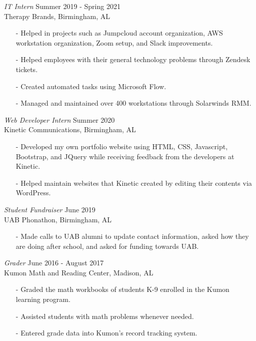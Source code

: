 \documentclass[margin, 10pt]{res} %
\begin{document}
\begin{resume}
{\sl IT Intern} \hfill Summer 2019 - Spring 2021 \\
Therapy Brands, Birmingham, AL 
\begin{itemize} \itemsep -2pt %
\item[-] Helped in projects such as Jumpcloud account organization, AWS workstation organization, Zoom setup, and Slack improvements.
\item[-] Helped employees with their general technology problems through Zendesk tickets.
\item[-] Created automated tasks using Microsoft Flow.
\item[-] Managed and maintained over 400 workstations through Solarwinds RMM.
\end{itemize} 

{\sl Web Developer Intern} \hfill Summer 2020 \\
Kinetic Communications, Birmingham, AL
\begin{itemize} \itemsep -2pt %
\item[-] Developed my own portfolio website using HTML, CSS, Javascript, Bootstrap, and JQuery while receiving feedback from the developers at Kinetic. 
\item[-] Helped maintain websites that Kinetic created by editing their contents via WordPress. 
\end{itemize}

{\sl Student Fundraiser} \hfill June 2019 \\
UAB Phonathon, Birmingham, AL
\begin{itemize} \itemsep -2pt %
\item[-] Made calls to UAB alumni to update contact information, asked how they are doing after school, and asked for funding towards UAB.
\end{itemize}

{\sl Grader} \hfill June 2016 - August 2017 \\
Kumon Math and Reading Center, Madison, AL
\begin{itemize} \itemsep -2pt %
\item[-] Graded the math workbooks of students K-9 enrolled in the Kumon learning program.
\item[-] Assisted students with math problems whenever needed.
\item[-] Entered grade data into Kumon's record tracking system.
\end{itemize}


\end{resume}
\end{document}
